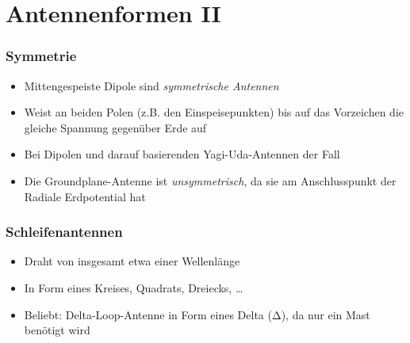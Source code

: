 \section{Antennenformen II}
\label{section:antennenformen_2}

\begin{frame}%

    \frametitle{Symmetrie}
    \begin{itemize}
        \item Mittengespeiste Dipole sind \emph{symmetrische Antennen}
        \item Weist an beiden Polen (z.B. den Einspeisepunkten) bis auf das Vorzeichen die gleiche Spannung gegenüber Erde auf
        \item Bei Dipolen und darauf basierenden Yagi-Uda-Antennen der Fall
        \item Die Groundplane-Antenne ist \emph{unsymmetrisch}, da sie am Anschlusspunkt der Radiale Erdpotential hat
    \end{itemize}

\end{frame}

\begin{frame}
\end{frame}

\begin{frame}
    \frametitle{Schleifenantennen}
    \begin{itemize}
        \item Draht von insgesamt etwa einer Wellenlänge
        \item In Form eines Kreises, Quadrats, Dreiecks, …
        \item Beliebt: Delta-Loop-Antenne in Form eines Delta (Δ), da nur ein Mast benötigt wird
    \end{itemize}
\end{frame}

